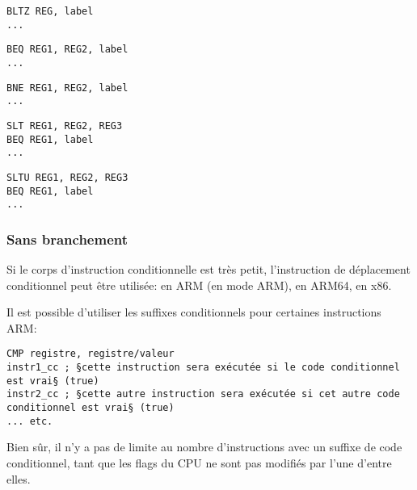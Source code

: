 \begin{lstlisting}[caption=§Check si plus petit que zéro§ (Branch if Less Than Zero) en utilisant une pseudo instruction,style=customasmMIPS]
BLTZ REG, label
...
\end{lstlisting}

\begin{lstlisting}[caption=§Check si les valeurs sont égales§ (Branch if EQual),style=customasmMIPS]
BEQ REG1, REG2, label
...
\end{lstlisting}

\begin{lstlisting}[caption=§Check si les valeurs ne sont pas égales§ (Branch if Not Equal),style=customasmMIPS]
BNE REG1, REG2, label
...
\end{lstlisting}

\begin{lstlisting}[caption=§Check REG2 plus petit que REG3 (signé)§,style=customasmMIPS]
SLT REG1, REG2, REG3
BEQ REG1, label
...
\end{lstlisting}

\begin{lstlisting}[caption=§Check REG2 plus petit que REG3 (non signé)§,style=customasmMIPS]
SLTU REG1, REG2, REG3
BEQ REG1, label
...
\end{lstlisting}

\subsubsection{Sans branchement}

Si le corps d'instruction conditionnelle est très petit, l'instruction de déplacement
conditionnel peut être utilisée:
 en ARM (en mode ARM),  en ARM64,  en x86.


Il est possible d'utiliser les suffixes conditionnels pour certaines instructions
ARM:

\begin{lstlisting}[caption=ARM (\ARMMode),style=customasmARM]
CMP registre, registre/valeur
instr1_cc ; §cette instruction sera exécutée si le code conditionnel est vrai§ (true)
instr2_cc ; §cette autre instruction sera exécutée si cet autre code conditionnel est vrai§ (true)
... etc.
\end{lstlisting}

Bien sûr, il n'y a pas de limite au nombre d'instructions avec un suffixe de code
conditionnel, tant que les flags du CPU ne sont pas modifiés par l'une d'entre elles.

